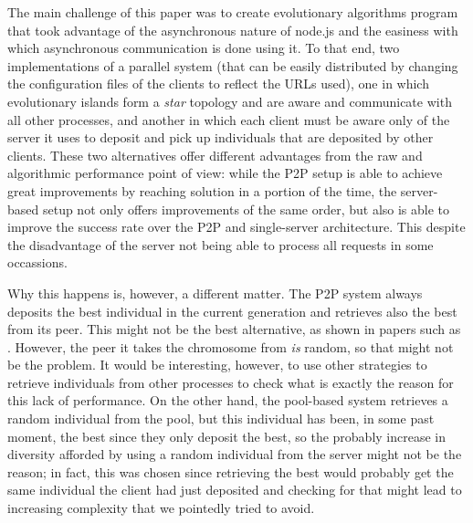 \documentclass{sig-alternate}
\begin{document}
The main challenge of this paper was to create evolutionary algorithms
program that took advantage of the asynchronous nature of node.js and
the easiness with which asynchronous communication is done using
it. To that end, two implementations of a parallel system (that can be
easily distributed by changing the configuration files of the clients
to reflect the URLs used), one in which evolutionary islands form a
{\em star} topology and are aware and communicate with all other
processes, and another in which each client must be aware only of the
server it uses to deposit and pick up individuals that are deposited
by other clients. These two alternatives offer different advantages
from the raw and algorithmic performance point of view: while the P2P
setup is able to achieve great improvements by reaching solution in a
portion of the time, the server-based setup not only offers
improvements of the same order, but also is able to improve the
success rate over the P2P and single-server architecture. This despite
the disadvantage of the server not being able to process all requests
in some occassions.

Why this happens is, however, a different matter. The P2P system
always deposits the best individual in the current generation and
retrieves also the best from its peer. This might not be the best
alternative, as shown in papers such as
\cite{multikulti:cec09}. However, the peer it takes the chromosome
from {\em is} random, so that might not be the problem. It would be
interesting, however, to use other strategies to retrieve individuals
from other processes to check what is exactly the reason for this lack
of performance. On the other hand, the pool-based system retrieves a
random individual from the pool, but this individual has been, in some
past moment, the best since they only deposit the best, so the
probably increase in diversity afforded by using a random individual
from the server might not be the reason; in fact, this was chosen
since retrieving the best would probably get the same individual the
client had just deposited and checking for that might lead to
increasing complexity that we pointedly tried to avoid. 
\end{document}
